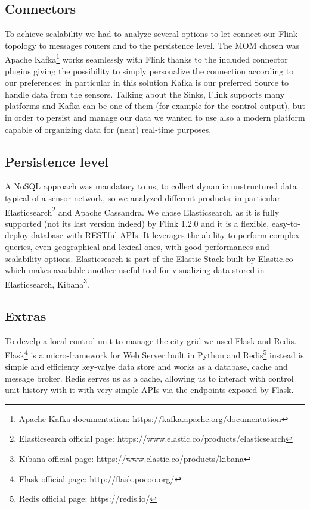 \subsection{Connectors}
To achieve scalability we had to analyze several options to let connect our Flink topology to messages routers and to the persistence level. The MOM chosen was Apache Kafka\footnote{Apache Kafka documentation: https://kafka.apache.org/documentation} works seamlessly with Flink thanks to the included connector plugins giving the possibility to simply personalize the connection according to our preferences: in particular in this solution Kafka is our preferred Source to handle data from the sensors. Talking about the Sinks, Flink supports many platforms and Kafka can be one of them (for example for the control output), but in order to persist and manage our data we wanted to use also a modern platform capable of organizing data for (near) real-time purposes.

\subsection{Persistence level}
A NoSQL approach was mandatory to us, to collect dynamic unstructured data typical of a sensor network, so we analyzed different products: in particular Elasticsearch\footnote{Elasticsearch official page: https://www.elastic.co/products/elasticsearch} and Apache Cassandra. We chose Elasticsearch, as it is fully supported (not its last version indeed) by Flink 1.2.0 and it is a flexible, easy-to-deploy database with RESTful APIs. It leverages the ability to perform complex queries, even geographical and lexical ones, with good performances and scalability options. Elasticsearch is part of the Elastic Stack built by Elastic.co which makes available another useful tool for visualizing data stored in Elasticsearch, Kibana\footnote{Kibana official page: https://www.elastic.co/products/kibana}.

\subsection{Extras}
To develp a local control unit to manage the city grid we used Flask and Redis. Flask\footnote{Flask official page: http://flask.pocoo.org/} is a micro-framework for Web Server built in Python and Redis\footnote{Redis official page: https://redis.io/} instead is simple and efficienty key-valye data store and works as a database, cache and message broker. Redis serves us as a cache, allowing us to interact with control unit history with it with very simple APIs via the endpoints exposed by Flask.

